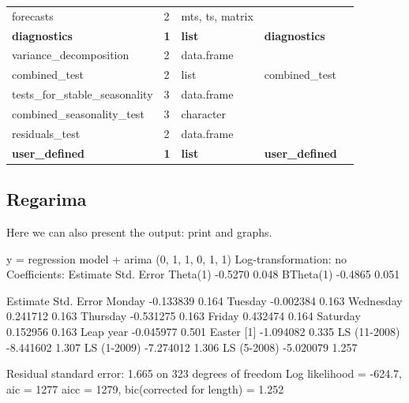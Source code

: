 \documentclass[article]{jss}
\begin{document}
\begin{longtable}[t]{lllll}
\hspace{2em}forecasts & 2 & mts, ts, matrix &  & \\
\textbf{\hspace{1em}diagnostics} & \textbf{1} & \textbf{list} & \textbf{diagnostics}\\
\addlinespace
\hspace{2em}variance\_decomposition & 2 & data.frame &  & \\
\hspace{2em}combined\_test & 2 & list & combined\_test & \\
\hspace{3em}tests\_for\_stable\_seasonality & 3 & data.frame &  & \\
\hspace{3em}combined\_seasonality\_test & 3 & character &  & \\
\hspace{2em}residuals\_test & 2 & data.frame &  & \\
\textbf{\hspace{1em}user\_defined} & \textbf{1} & \textbf{list} & \textbf{user\_defined}\\
\bottomrule
\end{longtable}\endgroup{}

\hypertarget{regarima}{%
\subsection{Regarima}\label{regarima}}

Here we can also present the output: print and graphs.

\begin{CodeChunk}


\begin{CodeOutput}
y = regression model + arima (0, 1, 1, 0, 1, 1)
Log-transformation: no
Coefficients:
          Estimate Std. Error
Theta(1)   -0.5270      0.048
BTheta(1)  -0.4865      0.051

              Estimate Std. Error
Monday       -0.133839      0.164
Tuesday      -0.002384      0.163
Wednesday     0.241712      0.163
Thursday     -0.531275      0.163
Friday        0.432474      0.164
Saturday      0.152956      0.163
Leap year    -0.045977      0.501
Easter [1]   -1.094082      0.335
LS (11-2008) -8.441602      1.307
LS (1-2009)  -7.274012      1.306
LS (5-2008)  -5.020079      1.257


Residual standard error: 1.665 on 323 degrees of freedom
Log likelihood = -624.7, aic =  1277 aicc =  1279, bic(corrected for length) = 1.252
\end{CodeOutput}
\end{CodeChunk}
\end{document}
